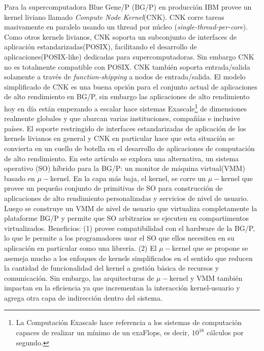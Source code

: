 Para la supercomputadora Blue Gene/P (BG/P) en producción IBM provee un kernel liviano llamado \emph{Compute Node Kernel}(CNK). CNK corre tareas masivamente en paralelo usando un thread por núcleo (\emph{single-thread-per-core}). Como otros kernels livianos, CNK soporta un subconjunto de interfaces de aplicación estandarizadas(POSIX), facilitando el desarrollo de aplicaciones(POSIX-like) dedicadas para supercomputadoras. Sin embargo CNK no es totalmente compatible con POSIX. CNK también soporta entrada/salida solamente a través de \emph{function-shipping} a nodos de entrada/salida. El modelo simplificado de CNK es una buena opción para el conjunto actual de aplicaciones de alto rendimiento en BG/P, sin embargo las aplicaciones de alto rendimiento hoy en día están empezando a escalar hace sistemas Exascale\footnote{La Computación Exascale hace referencia a los sistemas de computación capaces de realizar un mínimo de un exaFlops, es decir, $10^{18}$ cálculos por segundo.} de dimensiones realmente globales y que abarcan varias instituciones, compañías e inclusive países. El soporte restringido de interfaces estandarizadas de aplicación de los kernels livianos en general y CNK en particular hace que esta situación se convierta en un cuello de botella en el desarrollo de aplicaciones de computación de alto rendimiento. En este artículo se explora una alternativa, un sistema operativo (SO) híbrido para la BG/P: un monitor de máquina virtual(VMM) basado en $\mu-$kernel. En la capa más baja, el kernel, se corre un $\mu-$kernel que provee un pequeño conjunto de primitivas de SO para construcción de aplicaciones de alto rendimiento personalizadas y servicios de nivel de usuario. Luego se construye un VMM de nivel de usuario que virtualiza completamente la plataforme BG/P y permite que SO arbitrarios se ejecuten en compartimentos virtualizados. Beneficios: (1) provee compatibilidad con el hardware de la BG/P, lo que le permite a los programadores usar el SO que ellos necesiten en su aplicación en particular como una librería. (2) El $\mu-$kernel que se propone se asemeja mucho a los enfoques de kernels simplificados en el sentido que reducen la cantidad de funcionalidad del kernel a gestión básica de recursos y comunicación. Sin embargo, las arquitecturas de $\mu-$kernel y VMM también impactan en la eficiencia ya que incrementan la interacción kernel-usuario y agrega otra capa de indirección dentro del sistema.

